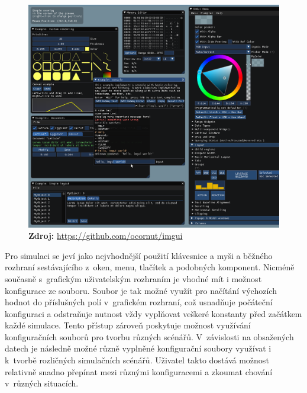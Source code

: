 \begin{figure}[h!]
	\centering
	\captionsetup{justification=centering}
	\includegraphics[scale=0.15]{obrazky-figures/imgui.png}
	\textbf{Zdroj: } \url{https://github.com/ocornut/imgui}
	\label{fig:structsEvap}
\end{figure}


Pro simulaci se jeví jako nejvhodnější použití klávesnice a myši a běžného rozhraní sestávajícího z~oken, menu, tlačítek a podobných komponent. Nicméně současně s~grafickým uživatelským rozhraním je vhodné mít i možnost konfigurace ze souboru. Soubor je tak možné využít pro načítání výchozích hodnot do příslušných polí v~grafickém rozhraní, což usnadňuje počáteční konfiguraci a odstraňuje nutnost vždy vyplňovat veškeré konstanty před začátkem každé simulace. Tento přístup zároveň poskytuje možnost využívání konfiguračních souborů pro tvorbu různých scénářů. V~závislosti na obsažených datech je následně možné různě vyplněné konfigurační soubory využívat i k~tvorbě rozličných simulačních scénářů. Uživatel takto dostává možnost relativně snadno přepínat mezi různými konfiguracemi a zkoumat chování v~různých situacích.

